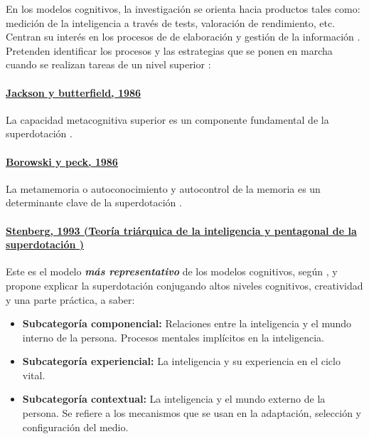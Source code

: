 \documentclass[12pt, a4paper]{article}
\begin{document}
	En los modelos cognitivos, la investigación se orienta hacia productos
	tales como: medición de la inteligencia a través de tests, valoración de rendimiento, etc. Centran su interés en los procesos de de elaboración y gestión de la información \parencite{Arocas2002OrientPsicopedGVA}. Pretenden identificar los procesos y las estrategias que se ponen en marcha cuando se realizan tareas de un nivel superior \parencite{reche2019models}:
	
	\paragraph{\underline{Jackson y butterfield, 1986}} La capacidad metacognitiva superior es un componente fundamental de la superdotación \parencite{Arocas2002OrientPsicopedGVA}.
	
	\paragraph{\underline{Borowski y peck, 1986}} La metamemoria o autoconocimiento y autocontrol de la memoria es un determinante clave de la superdotación \parencite{Arocas2002OrientPsicopedGVA}.
	
	
	
	

	
	
	
	
	\paragraph{\underline{Stenberg, 1993 (Teoría triárquica de la inteligencia y pentagonal de la superdotación )}}
	
Este es el modelo \textit{\textbf{más representativo}} de los modelos cognitivos, según \textcite{reche2019models}, y propone explicar la superdotación conjugando altos niveles cognitivos, creatividad y una parte práctica, a saber:
	
	\begin{itemize}[noitemsep]
		\item \textbf{Subcategoría componencial:} Relaciones entre la inteligencia y el mundo interno de la persona. Procesos mentales implícitos en la inteligencia.
		\item \textbf{Subcategoría experiencial:} La inteligencia y su experiencia en el ciclo vital.
		\item \textbf{Subcategoría contextual:} La inteligencia y el mundo externo de la persona. Se refiere a los mecanismos que se usan en la adaptación, selección y configuración del medio.
	\end{itemize}
	
\end{document}
